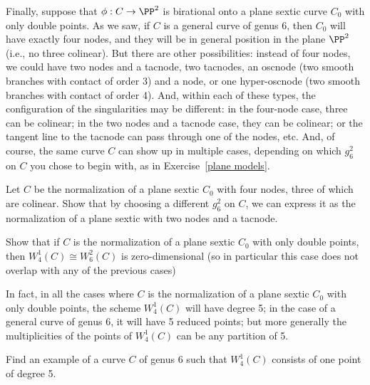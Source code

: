 Finally, suppose that $\phi : C \to \PP^2$ is birational onto a plane sextic curve $C_0$ with only double points. As we saw, if $C$ is a general curve of genus 6, then $C_0$ will have exactly four nodes, and they will be in general position in the plane $\PP^2$ (i.e., no three colinear). But there are other possibilities: instead of four nodes, we could have two nodes and a tacnode, two tacnodes, an oscnode (two smooth branches with contact of order 3) and a node, or one hyper-oscnode (two smooth branches with contact of order 4). And, within each of these types, the configuration of the singularities may be different: in the four-node case, three can be colinear; in the two nodes and a tacnode case, they can be colinear; or the tangent line to the tacnode can pass through one of the nodes, etc. And, of course, the same curve $C$ can show up in multiple cases, depending on which $g^2_6$ on $C$ you chose to begin with, as in Exercise~\ref{plane models}. 

\begin{exercise}\label{plane models}
Let $C$ be the normalization of a plane sextic $C_0$ with four nodes, three of which are colinear. Show that by choosing a different $g^2_6$ on $C$, we can express it as the normalization of a plane sextic with two nodes and a tacnode.
\end{exercise}


\begin{exercise}
Show that if $C$ is the normalization of a plane sextic $C_0$ with only double points, then $W^1_4(C) \cong W^2_6(C)$ is zero-dimensional (so in particular this case does not overlap with any of the previous cases)
\end{exercise}

In fact, in all the cases where $C$ is the normalization of a plane sextic $C_0$ with only double points, the scheme $W^1_4(C)$ will have degree 5; in the  case of a general curve of genus 6, it will have 5 reduced points; but more generally the multiplicities of the points of $W^1_4(C)$ can be any partition of 5.


\begin{exercise}
Find an example of a curve $C$ of genus 6 such that $W^1_4(C)$ consists of one point of degree 5.
\end{exercise}

%

